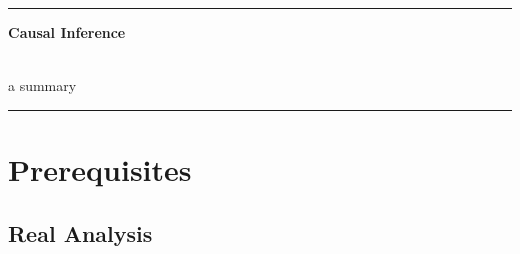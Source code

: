 \documentclass[8pt,twoside]{extarticle}
\begin{document}
\vspace*{18em}

\hrule
\begin{center}
{\fontsize{30}{60}\selectfont \textbf{Causal Inference}} \\ \

{\fontsize{20}{60}\selectfont a summary}
\end{center}
\hrule



\tableofcontents



\raggedright %
\setlength{\columnseprule}{0.3pt} %





\section{Prerequisites}

\subsection[Real Analysis]{Real Analysis \citep{abbott2015understanding}}
\end{document}
